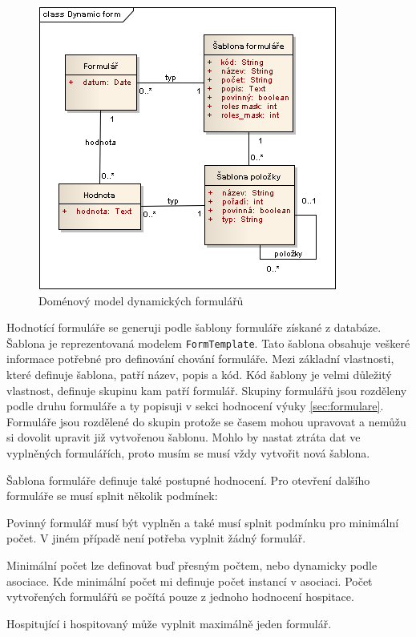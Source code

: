 \begin{figure}[h]
\begin{center}
\includegraphics[scale=0.6]{figures/Dynamic_form}
\caption{Doménový model dynamických formulářů}
\label{fig:dynamicform}
\end{center}
\end{figure}

Hodnotící formuláře se generuji podle šablony formuláře získané z databáze. Šablona je reprezentovaná modelem \verb|FormTemplate|. Tato šablona obsahuje veškeré informace potřebné pro definování chování formuláře. Mezi základní vlastnosti, které definuje šablona, patří název, popis a kód. Kód šablony je velmi důležitý vlastnost, definuje skupinu kam patří formulář. Skupiny formulářů jsou rozděleny podle druhu formuláře a ty popisuji v sekci hodnocení výuky \ref{sec:formulare}. Formuláře jsou rozdělené do skupin protože se časem mohou upravovat a nemůžu si dovolit upravit již vytvořenou šablonu. Mohlo by nastat ztráta dat ve vyplněných formulářích, proto musím se musí vždy vytvořit nová šablona.  

Šablona formuláře definuje také postupné hodnocení. Pro otevření dalšího formuláře se musí splnit několik podmínek:

\begin{list}{}{}
\item Povinný formulář musí být vyplněn a také musí splnit podmínku pro minimální počet. V jiném případě není potřeba vyplnit žádný formulář.
\item Minimální počet lze definovat buď přesným počtem, nebo dynamicky podle asociace. Kde minimální počet mi definuje počet instancí v asociaci. Počet vytvořených formulářů se počítá pouze z jednoho hodnocení hospitace.
\item Hospitující i hospitovaný může vyplnit maximálně jeden formulář.
\end{list}

